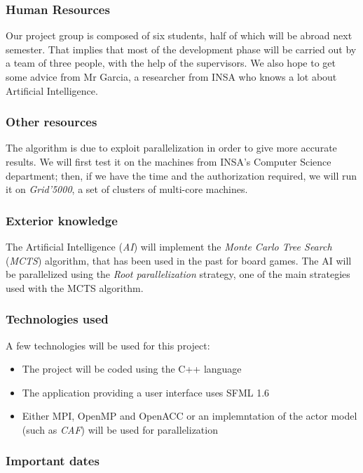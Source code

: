 \subsubsection{Human Resources}

Our project group is composed of six students, half of which will be abroad next semester.
That implies that most of the development phase will be carried out by a team of three people, with the help of the supervisors.
We also hope to get some advice from Mr Garcia, a researcher from INSA who knows a lot about Artificial Intelligence.

\subsubsection{Other resources}

The algorithm is due to exploit parallelization in order to give more accurate results. We will first test it on the machines from INSA's Computer Science department;
then, if we have the time and the authorization required, we will run it on \emph{Grid'5000}, a set of clusters of multi-core machines.

\subsubsection{Exterior knowledge}

The Artificial Intelligence (\emph{AI}) will implement the \emph{Monte Carlo Tree Search} (\emph{MCTS}) algorithm, that has been used in the past for board games.
The AI will be parallelized using the \emph{Root parallelization} strategy, one of the main strategies used with the MCTS algorithm.

\subsubsection{Technologies used}

A few technologies will be used for this project:
\begin{itemize}
	\item The project will be coded using the C++ language
	\item The application providing a user interface uses SFML 1.6
	\item Either MPI, OpenMP and OpenACC or an implemntation of the actor model (such as \emph{CAF}) will be used for parallelization
\end{itemize}

\subsubsection{Important dates}

